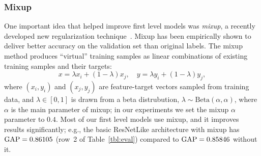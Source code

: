 \documentclass[runningheads]{llncs}
\begin{document}
\subsubsection*{Mixup}
One important idea that helped improve first level models was \emph{mixup}, a recently developed new regularization technique~\cite{zhang2018mixup}. Mixup has been empirically shown to deliver better accuracy on the validation set than original labels. The mixup method produces ``virtual'' training samples as linear combinations of existing training samples and their targets: 
$$x = \lambda x_i+(1 - \lambda)x_j,\quad y = \lambda y_i+(1 - \lambda)y_j,$$ where $(x_i, y_i)$ and $(x_j, y_j)$ are feature-target vectors sampled from training data, and $\lambda\in[0,1]$ is drawn from a beta distrubution, $\lambda\sim\mathrm{Beta}(\alpha,\alpha)$, where $\alpha$ is the main parameter of mixup; in our experiments we set the mixup $\alpha$ parameter to $0.4$. Most of our first level models use mixup, and it improves results significantly; e.g., the basic ResNetLike architecture with mixup has $\mathrm{GAP}=0.86105$ (row~2 of Table~\ref{tbl:eval}) compared to $\mathrm{GAP}=0.85846$ without it.
\end{document}

